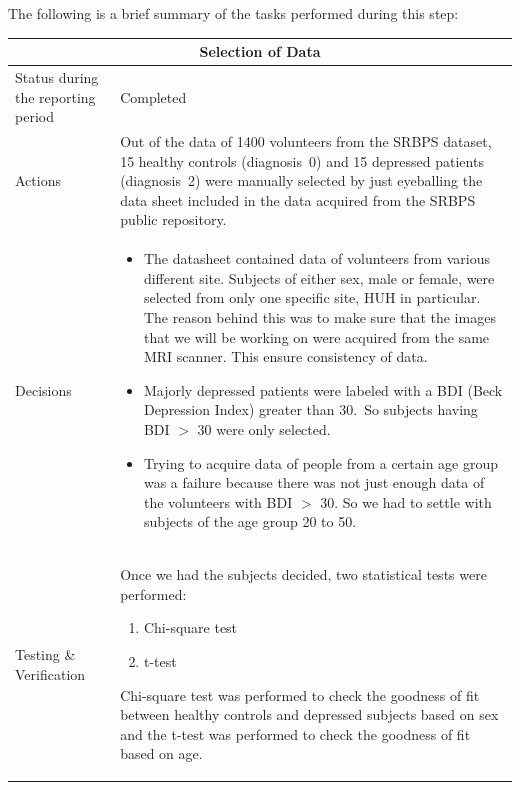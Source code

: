 \documentclass[12pt]{article}
\begin{document}
The following is a brief summary of the tasks performed during this
step:

\begin{table}[H]
  \centering
  \begin{tabular} {| m{3.3cm} | m{11.5cm} | }
    \hline
    \multicolumn{2}{|c|}{Selection of Data} \\ \hline
    Status during the reporting period   & Completed   \\ \hline
    Actions &
    Out of the data of 1400 volunteers from the SRBPS dataset, 15
    healthy controls (diagnosis~0) and 15 depressed patients
    (diagnosis~2) were manually selected by just eyeballing the data
    sheet included in the data acquired from the SRBPS public
    repository.  \\ \hline

    Decisions &
    \begin{itemize}

      \item The datasheet contained data of volunteers from various
        different site. Subjects of either sex, male or female, were
        selected from only one specific site, HUH in particular. The
        reason behind this was to make sure that the images that we
        will be working on were acquired from the same MRI scanner.
        This ensure consistency of data.

      \item Majorly depressed patients were labeled with a BDI (Beck
        Depression Index) greater than 30.~So subjects having
        BDI $>$ 30 were only selected.

      \item Trying to acquire data of people from a certain age group
        was a failure because there was not just enough data of the
        volunteers with BDI $>$ 30. So we had to settle with subjects
        of the age group 20 to 50.

    \end{itemize} \\ \hline

    Testing \& Verification &
    Once we had the subjects decided, two statistical tests were
    performed:
    \begin{enumerate}[noitemsep]
      \item Chi-square test
      \item t-test
    \end{enumerate}

    Chi-square test was performed to check the goodness of fit between
    healthy controls and depressed subjects based on sex and the
    t-test was performed to check the goodness of fit based on age. \\ \hline
  \end{tabular}
\end{table}
\end{document}
